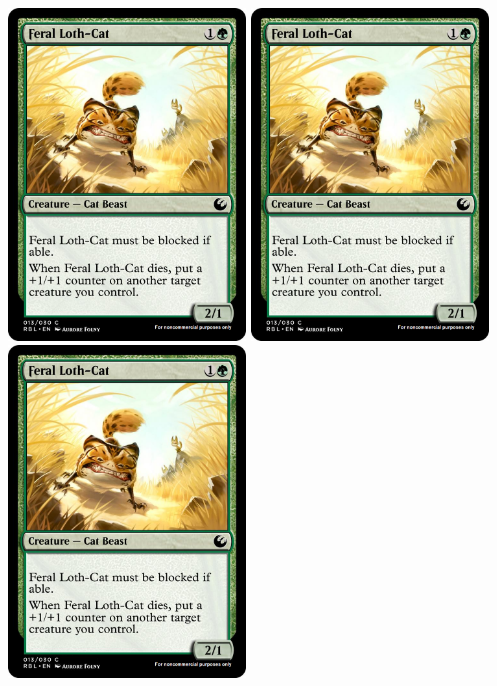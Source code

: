 \documentclass[a4paper,12pt]{article}
\begin{document}
\includegraphics[width=63mm,height=88mm]{images/Feral_Loth-Cat.png}
\includegraphics[width=63mm,height=88mm]{images/Feral_Loth-Cat.png}
\includegraphics[width=63mm,height=88mm]{images/Feral_Loth-Cat.png}
\end{document}
